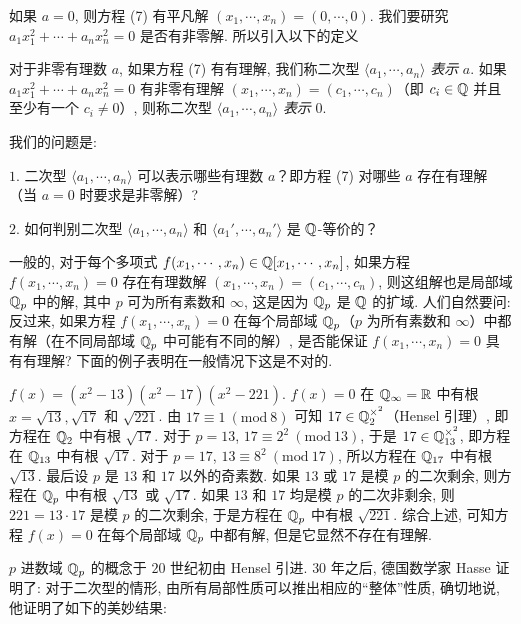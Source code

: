 如果 $a=0$, 则方程 (7) 有平凡解 $(x_1,\cdots,x_n)=(0,\cdots,0)$. 我们要研究 $a_1x_1^2+\cdots+a_nx_n^2=0$ 是否有非零解. 所以引入以下的定义

\begin{definition}\label{def:ch9-2}
对于非零有理数 $a$, 如果方程 (7) 有有理解, 我们称二次型 $\langle a_1,\cdots,a_n\rangle$ \emph{表示} $a$. 如果 $a_1x_1^2+\cdots+a_nx_n^2=0$ 有非零有理解 $(x_1,\cdots,x_n)=(c_1,\cdots,c_n)$（即 $c_i\in\mathbb{Q}$ 并且至少有一个 $c_i\neq 0$）, 则称二次型 $\langle a_1,\cdots,a_n\rangle$ \emph{表示} $0$.
\end{definition}

我们的问题是:

$1$. 二次型 $\langle a_1,\cdots,a_n\rangle$ 可以表示哪些有理数 $a$？即方程 (7) 对哪些 $a$ 存在有理解（当 $a=0$ 时要求是非零解）?

$2$. 如何判别二次型 $\langle a_1,\cdots,a_n\rangle$ 和 $\langle a_1',\cdots,a_n'\rangle$ 是 $\mathbb{Q}$-等价的？

一般的, 对于每个多项式 $f(x_1,\cdots,x_n)\in\mathbb{Q}[x_1,\cdots,x_n]$, 如果方程 $f(x_1,\cdots,x_n)=0$ 存在有理数解 $(x_1,\cdots,x_n)=(c_1,\cdots,c_n)$, 则这组解也是局部域 $\mathbb{Q}_p$ 中的解, 其中 $p$ 可为所有素数和 $\infty$, 这是因为 $\mathbb{Q}_p$ 是 $\mathbb{Q}$ 的扩域. 人们自然要问: 反过来, 如果方程 $f(x_1,\cdots,x_n)=0$ 在每个局部域 $\mathbb{Q}_p$（$p$ 为所有素数和 $\infty$）中都有解（在不同局部域 $\mathbb{Q}_p$ 中可能有不同的解）, 是否能保证 $f(x_1,\cdots,x_n)=0$ 具有有理解? 下面的例子表明在一般情况下这是不对的.

\begin{example}
$f(x)=(x^2-13)(x^2-17)(x^2-221)$. $f(x)=0$ 在 $\mathbb{Q}_{\infty}=\mathbb{R}$ 中有根 $x=\sqrt{13},\sqrt{17}$ 和 $\sqrt{221}$. 由 $17\equiv 1\ (\mathrm{mod}\ 8)$ 可知 $17\in\mathbb{Q}_2^{\times^2}$（Hensel 引理）, 即方程在 $\mathbb{Q}_2$ 中有根 $\sqrt{17}$. 对于 $p=13$, $17\equiv 2^2\ (\mathrm{mod}\ 13)$, 于是 $17\in\mathbb{Q}_{13}^{\times^2}$, 即方程在 $\mathbb{Q}_{13}$ 中有根 $\sqrt{17}$. 对于 $p=17$, $13\equiv 8^2\ (\mathrm{mod}\ 17)$, 所以方程在 $\mathbb{Q}_{17}$ 中有根 $\sqrt{13}$. 最后设 $p$ 是 $13$ 和 $17$ 以外的奇素数. 如果 $13$ 或 $17$ 是模 $p$ 的二次剩余, 则方程在 $\mathbb{Q}_p$ 中有根 $\sqrt{13}$ 或 $\sqrt{17}$. 如果 $13$ 和 $17$ 均是模 $p$ 的二次非剩余, 则 $221=13\cdot 17$ 是模 $p$ 的二次剩余, 于是方程在 $\mathbb{Q}_p$ 中有根 $\sqrt{221}$. 综合上述, 可知方程 $f(x)=0$ 在每个局部域 $\mathbb{Q}_p$ 中都有解, 但是它显然不存在有理解.
\end{example}

$p$ 进数域 $\mathbb{Q}_p$ 的概念于 $20$ 世纪初由 Hensel 引进. $30$ 年之后, 德国数学家 Hasse 证明了: 对于二次型的情形, 由所有局部性质可以推出相应的``整体''性质, 确切地说, 他证明了如下的美妙结果:


